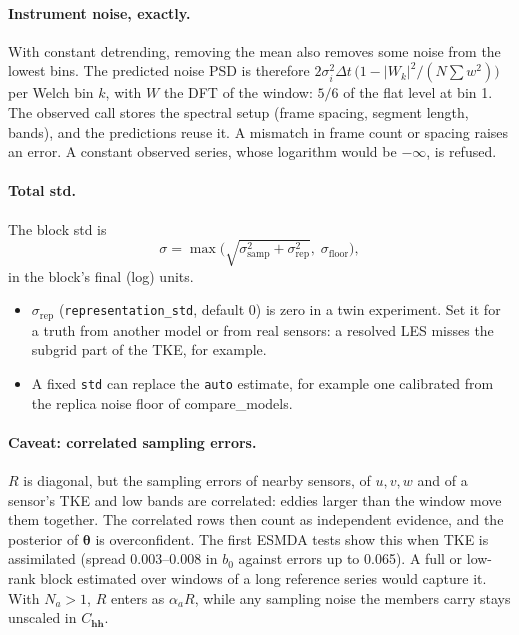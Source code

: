 \documentclass[11pt,a4paper]{article}
\begin{document}
\paragraph{Instrument noise, exactly.} With constant detrending, removing the
mean also removes some noise from the lowest bins. The predicted noise PSD
is therefore $2\sigma_i^2\Delta t\,\big(1 - |W_k|^2/(N\textstyle\sum w^2)\big)$
per Welch bin $k$, with $W$ the DFT of the window: $5/6$ of the flat level at
bin 1. The observed call stores the spectral setup (frame spacing, segment
length, bands), and the predictions reuse it. A mismatch in frame count or
spacing raises an error. A constant observed series, whose logarithm would be
$-\infty$, is refused.

\paragraph{Total std.} The block std is
\begin{equation}
  \sigma = \max\!\Big(\sqrt{\sigma_{\mathrm{samp}}^2 + \sigma_{\mathrm{rep}}^2},\;
    \sigma_{\mathrm{floor}}\Big),
\end{equation}
in the block's final (log) units.
\begin{itemize}
\item $\sigma_{\mathrm{rep}}$ (\texttt{representation\_std}, default 0) is
  zero in a twin experiment. Set it for a truth from another model or from
  real sensors: a resolved LES misses the subgrid part of the TKE, for
  example.
\item A fixed \texttt{std} can replace the \texttt{auto} estimate, for example
  one calibrated from the replica noise floor of compare\_models.
\end{itemize}

\paragraph{Caveat: correlated sampling errors.} $R$ is diagonal, but the
sampling errors of nearby sensors, of $u, v, w$ and of a sensor's TKE and low
bands are correlated: eddies larger than the window move them together. The
correlated rows then count as independent evidence, and the posterior of
$\bm\theta$ is overconfident. The first ESMDA tests show this when TKE is
assimilated (spread 0.003--0.008 in $b_0$ against errors up to 0.065). A
full or low-rank block estimated over windows of a long reference series
would capture it. With $N_a > 1$, $R$ enters as $\alpha_a R$, while any
sampling noise the members carry stays unscaled in $C_{\bm h\bm h}$.
\end{document}
